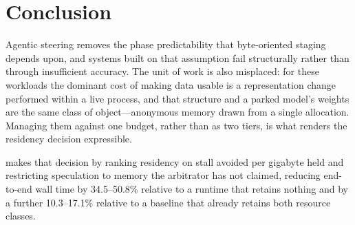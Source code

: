 
\section{Conclusion}

Agentic steering removes the phase predictability that byte-oriented staging
depends upon, and systems built on that assumption fail structurally rather
than through insufficient accuracy. The unit of work is also misplaced: for
these workloads the dominant cost of making data usable is a representation
change performed within a live process, and that structure and a parked
model's weights are the same class of object---anonymous memory drawn from a
single allocation. Managing them against one budget, rather than as two tiers,
is what renders the residency decision expressible.

\sysname{} makes that decision by ranking residency on stall avoided per
gigabyte held and restricting speculation to memory the arbitrator has not
claimed, reducing end-to-end wall time by 34.5--50.8\% relative to a runtime
that retains nothing and by a further 10.3--17.1\% relative to a baseline that
already retains both resource classes.
